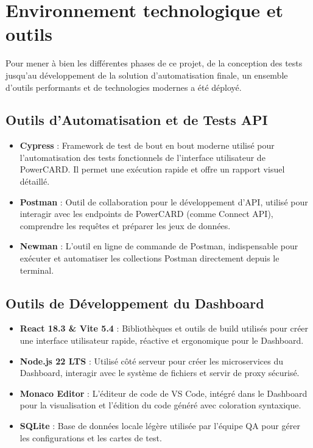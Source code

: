 \section{Environnement technologique et outils}

Pour mener à bien les différentes phases de ce projet, de la conception des tests jusqu'au développement de la solution d'automatisation finale, un ensemble d'outils performants et de technologies modernes a été déployé.

\subsection{Outils d'Automatisation et de Tests API}
\begin{itemize}[leftmargin=*]
\item \textbf{Cypress} : Framework de test de bout en bout moderne utilisé pour l'automatisation des tests fonctionnels de l'interface utilisateur de PowerCARD. Il permet une exécution rapide et offre un rapport visuel détaillé.
\item \textbf{Postman} : Outil de collaboration pour le développement d'API, utilisé pour interagir avec les endpoints de PowerCARD (comme Connect API), comprendre les requêtes et préparer les jeux de données.
\item \textbf{Newman} : L'outil en ligne de commande de Postman, indispensable pour exécuter et automatiser les collections Postman directement depuis le terminal.
\end{itemize}

\subsection{Outils de Développement du Dashboard}
\begin{itemize}[leftmargin=*]
\item \textbf{React 18.3 \& Vite 5.4} : Bibliothèques et outils de build utilisés pour créer une interface utilisateur rapide, réactive et ergonomique pour le Dashboard.
\item \textbf{Node.js 22 LTS} : Utilisé côté serveur pour créer les microservices du Dashboard, interagir avec le système de fichiers et servir de proxy sécurisé.
\item \textbf{Monaco Editor} : L'éditeur de code de VS Code, intégré dans le Dashboard pour la visualisation et l'édition du code généré avec coloration syntaxique.
\item \textbf{SQLite} : Base de données locale légère utilisée par l'équipe QA pour gérer les configurations et les cartes de test.
\end{itemize}

